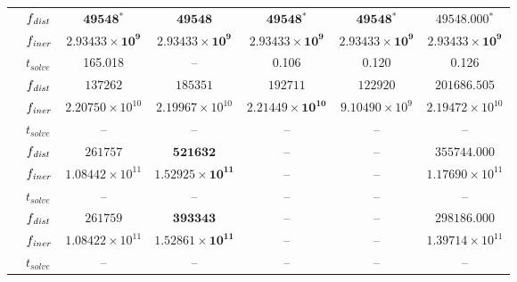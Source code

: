 \begin{landscape}
\begin{table}[t]
\begin{tabular}{llccccc}
			 & $f_\mathit{dist}$ & $\mathbf{49548{}^*}$ & $\mathbf{49548}$ & $\mathbf{49548{}^*}$ & $\mathbf{49548{}^*}$ & $\mathbf{49548.000{}^*}$ \\
			& $f_\mathit{iner}$ & $\mathbf{2.93433\times 10^{9}}$ & $\mathbf{2.93433\times 10^{9}}$ & $\mathbf{2.93433\times 10^{9}}$ & $\mathbf{2.93433\times 10^{9}}$ & $\mathbf{2.93433\times 10^{9}}$ \\
			& $t_{solve}$ & 165.018 & -- & 0.106 & 0.120 & 0.126 \\
			\midrule
			
			 & $f_\mathit{dist}$ & $137262$ & $185351$ & $192711$ & $122920$ & $\mathbf{201686.505}$ \\
			& $f_\mathit{iner}$ & $2.20750\times 10^{10}$ & $2.19967\times 10^{10}$ & $\mathbf{2.21449\times 10^{10}}$ & $9.10490\times 10^{9}$ & $2.19472\times 10^{10}$ \\
			& $t_{solve}$ & -- & -- & -- & -- & -- \\
			\midrule
			
			 & $f_\mathit{dist}$ & $261757$ & $\mathbf{521632}$ & -- & -- & $355744.000$ \\
			& $f_\mathit{iner}$ & $1.08442\times 10^{11}$ & $\mathbf{1.52925\times 10^{11}}$ & -- & -- & $1.17690\times 10^{11}$ \\
			& $t_{solve}$ & -- & -- & -- & -- & -- \\
			\midrule
			
			 & $f_\mathit{dist}$ & $261759$ & $\mathbf{393343}$ & -- & -- & $298186.000$ \\
			& $f_\mathit{iner}$ & $1.08422\times 10^{11}$ & $\mathbf{1.52861\times 10^{11}}$ & -- & -- & $1.39714\times 10^{11}$ \\
			& $t_{solve}$ & -- & -- & -- & -- & -- \\
			
			\bottomrule
		\end{tabular}
	\end{table}
	
\end{landscape}

